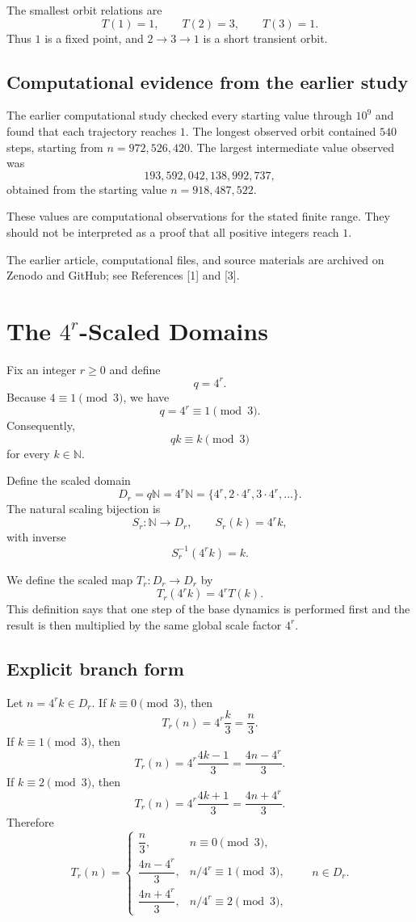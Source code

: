 \documentclass[11pt]{article}
\newcommand{\N}{\mathbb{N}}
\begin{document}
The smallest orbit relations are
\[
T(1)=1,\qquad T(2)=3,\qquad T(3)=1.
\]
Thus $1$ is a fixed point, and $2\to3\to1$ is a short transient orbit.

\subsection{Computational evidence from the earlier study}
The earlier computational study checked every starting value through $10^9$ and found that each trajectory reaches $1$. The longest observed orbit contained $540$ steps, starting from $n=972{,}526{,}420$. The largest intermediate value observed was
\[
193{,}592{,}042{,}138{,}992{,}737,
\]
obtained from the starting value $n=918{,}487{,}522$.

These values are computational observations for the stated finite range. They should not be interpreted as a proof that all positive integers reach $1$.

The earlier article, computational files, and source materials are archived on Zenodo and GitHub; see References [1] and [3].

\section{The $4^r$-Scaled Domains}
Fix an integer $r\ge0$ and define
\[
q=4^r.
\]
Because $4\equiv1\pmod3$, we have
\begin{equation}
q=4^r\equiv1\pmod3.
\label{eq:qmod3}
\end{equation}
Consequently,
\[
qk\equiv k\pmod3
\]
for every $k\in\N$.

Define the scaled domain
\[
D_r=q\N=4^r\N=\{4^r,2\cdot4^r,3\cdot4^r,\ldots\}.
\]
The natural scaling bijection is
\begin{equation}
S_r:\N\to D_r,\qquad S_r(k)=4^rk,
\label{eq:scaling}
\end{equation}
with inverse
\[
S_r^{-1}(4^rk)=k.
\]

We define the scaled map $T_r:D_r\to D_r$ by
\begin{equation}
T_r(4^rk)=4^rT(k).
\label{eq:scaleddefinition}
\end{equation}
This definition says that one step of the base dynamics is performed first and the result is then multiplied by the same global scale factor $4^r$.

\subsection{Explicit branch form}
Let $n=4^rk\in D_r$. If $k\equiv0\pmod3$, then
\[
T_r(n)=4^r\frac{k}{3}=\frac{n}{3}.
\]
If $k\equiv1\pmod3$, then
\[
T_r(n)=4^r\frac{4k-1}{3}=\frac{4n-4^r}{3}.
\]
If $k\equiv2\pmod3$, then
\[
T_r(n)=4^r\frac{4k+1}{3}=\frac{4n+4^r}{3}.
\]
Therefore
\begin{equation}
T_r(n)=\begin{cases}
\dfrac{n}{3},&n\equiv0\pmod3,\\[6pt]
\dfrac{4n-4^r}{3},&n/4^r\equiv1\pmod3,\\[6pt]
\dfrac{4n+4^r}{3},&n/4^r\equiv2\pmod3,
\end{cases}
\qquad n\in D_r.
\label{eq:scaledbranch}
\end{equation}
\end{document}

